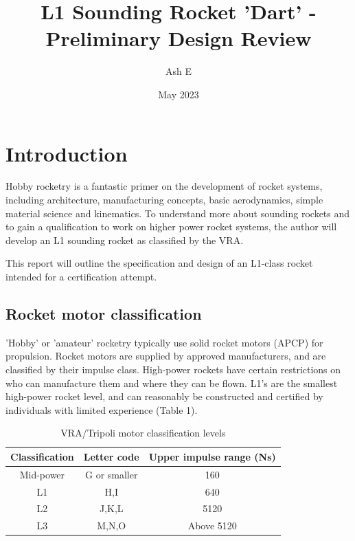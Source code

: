 \documentclass{article}
\title{L1 Sounding Rocket 'Dart' - Preliminary Design Review}
\author{Ash E}
\date{May 2023}
\begin{document}
\maketitle

\section{Introduction}



Hobby rocketry is a fantastic primer on the development of rocket systems, 
including architecture, 
manufacturing concepts, 
basic aerodynamics, 
simple material science 
and kinematics. 
To understand more about sounding rockets 
and to gain a qualification to work on higher power rocket systems, 
the author will develop an L1 sounding rocket as classified by the VRA.


This report will outline the specification and design 
of an L1-class rocket intended for a certification attempt.

\subsection{Rocket motor classification}


'Hobby' or 'amateur' rocketry typically use solid rocket motors (APCP) for propulsion. 
Rocket motors are supplied by approved manufacturers, 
and are classified by their impulse class. 
High-power rockets have certain restrictions on who can manufacture them 
and where they can be flown. 
L1's are the smallest high-power rocket level, 
and can reasonably be constructed 
and certified by individuals with limited experience (Table 1).

\begin{table}[]
    \centering
    \begin{tabular}{c|c|c}
         Classification & Letter code & Upper impulse range (Ns) \\
         \hline
         Mid-power & G or smaller & 160 \\
         L1 & H,I & 640 \\
         L2 & J,K,L & 5120 \\
         L3 & M,N,O & Above 5120\\
    \end{tabular}
    \caption{VRA/Tripoli motor classification levels}
    \label{tab:my_label}
\end{table}
\end{document}
